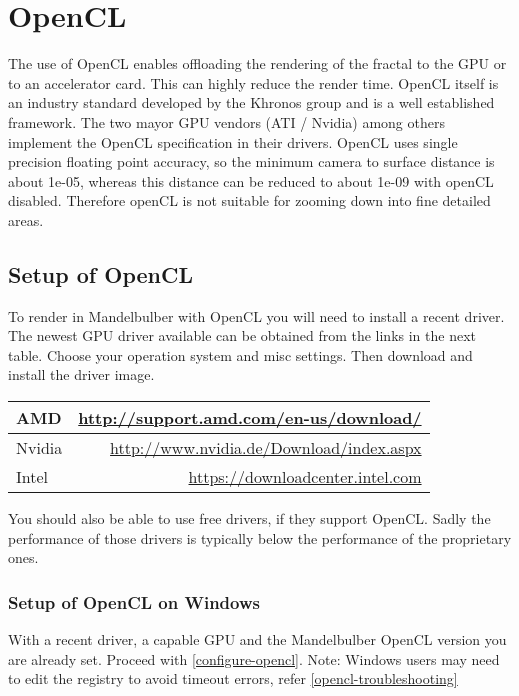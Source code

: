 

\section{OpenCL}\label{opencl}

The use of OpenCL enables offloading the rendering of the fractal to the
GPU or to an accelerator card. This can highly reduce the render time.
OpenCL itself is an industry standard developed by the Khronos group and
is a well established framework. The two mayor GPU vendors (ATI / Nvidia)
among others implement the OpenCL specification in their drivers.
OpenCL uses single precision floating point accuracy, so the minimum camera to surface distance is about 1e-05, whereas  this distance can be reduced to about 1e-09 with openCL disabled. Therefore openCL is not suitable for zooming down into fine detailed areas.

\subsection{Setup of OpenCL}\label{setup-opencl}
To render in Mandelbulber with OpenCL you will need to install a recent driver.
The newest GPU driver available can be obtained from the links in the next table.
Choose your operation system and misc settings.
Then download and install the driver image.

\begin{center}
	\begin{tabular}{ | l | r | }
		\hline
		AMD 	&
		\href{http://support.amd.com/en-us/download/}{http://support.amd.com/en-us/download/}
		\\ \hline
		Nvidia 	& 
		\href{http://www.nvidia.de/Download/index.aspx}{http://www.nvidia.de/Download/index.aspx}
		\\ \hline
		Intel	&
		\href{https://downloadcenter.intel.com}{https://downloadcenter.intel.com}
		\\ \hline
	\end{tabular}
\end{center}

You should also be able to use free drivers, if they support OpenCL.
Sadly the performance of those drivers is typically below the performance of the proprietary ones.

\subsubsection{Setup of OpenCL on Windows}\label{setup-opencl-windows}
With a recent driver, a capable GPU and the Mandelbulber OpenCL version you are already set.
Proceed with \ref{configure-opencl}. Note: Windows users may need to edit the registry to avoid timeout errors, refer \ref{opencl-troubleshooting}

